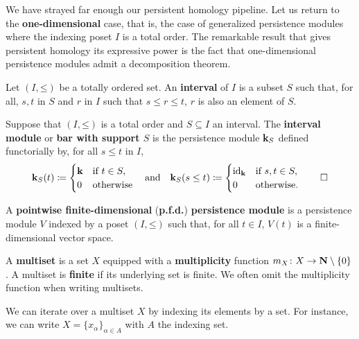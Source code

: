 We have strayed far enough our persistent homology pipeline. Let us return to the \textbf{one-dimensional} case, that is, the case of generalized persistence modules where the indexing poset $I$ is a total order. The remarkable result that gives persistent homology its expressive power is the fact that one-dimensional persistence modules admit a decomposition theorem.

\begin{definition}
\label{!D:interval}
  Let $(I, \mathord{\leq})$ be a totally ordered set. An \textbf{interval} of $I$ is a subset $S$ such that, for all, $s, t$ in $S$ and $r$ in $I$ such that $s \leq r \leq t$, $r$ is also an element of $S$.
  
  Suppose that $(I, \mathord{\leq})$ is a total order and $S \subseteq I$ an interval. The \textbf{interval module} or \textbf{bar with support $S$} is the persistence module $\mathbf{k}_S$ defined functorially by, for all $s \leq t$ in $I$,
  \[
    \mathbf{k}_S(t) \coloneq \begin{cases}
      \mathbf{k} & \text{if } t \in S, \\
      0 & \text{otherwise}
    \end{cases}
    \quad \text{and} \quad
    \mathbf{k}_S(s \leq t) \coloneq \begin{cases}
      \operatorname{id}_{\mathbf{k}} & \text{if } s, t \in S, \\
      0 & \text{otherwise}.
    \end{cases}
    \qedhere
  \]
\end{definition}

\begin{definition}
  A \textbf{pointwise finite-dimensional} (\textbf{p.f.d.}) \textbf{persistence module} is a persistence module $V$ indexed by a poset $(I, \mathord{\leq})$ such that, for all $t \in I$, $V(t)$ is a finite-dimensional vector space.
\end{definition}

\begin{definition}
  A \textbf{multiset} is a set $X$ equipped with a \textbf{multiplicity} function $m_X \colon X \to \mathbf{N} \setminus \{0\}$. A multiset is \textbf{finite} if its underlying set is finite. We often omit the multiplicity function when writing multisets.
  
  We can iterate over a multiset $X$ by indexing its elements by a set. For instance, we can write $X = \{x_\alpha\}_{\alpha \in A}$ with $A$ the indexing set.
\end{definition}

